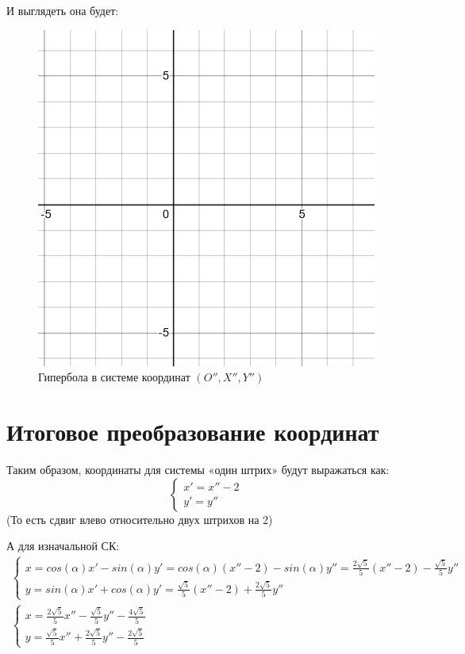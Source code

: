 \documentclass[12pt, a4paper]{article}
\begin{document}
    И выглядеть она будет:
    
    \begin{figure}[h!]
        \centering
        \includegraphics[width=\textwidth]{resources/1.7_grid_x'.png}
        \caption{Гипербола в системе координат $(O'', X'', Y'')$}
        \label{fig:grid_3}
    \end{figure}
    \FloatBarrier


    \section{Итоговое преобразование координат}

    Таким образом, координаты для системы «один штрих» будут выражаться как:
    \begin{equation}
        \begin{cases}
            x' = x'' - 2 \\
            y' = y''
        \end{cases}
    \end{equation}
    (То есть сдвиг влево относительно двух штрихов на 2)

    А для изначальной СК:
    \begin{gather}
        \begin{cases}
            x = cos(\alpha) x' - sin(\alpha) y' = cos(\alpha) (x'' - 2) - sin(\alpha) y'' = \frac{2 \sqrt{5}}{5} (x'' - 2) - \frac{\sqrt{5}}{5} y'' \\
            y = sin(\alpha) x' + cos(\alpha) y' = \frac{\sqrt{5}}{5} (x'' - 2) + \frac{2 \sqrt{5}}{5} y''
        \end{cases} \\
        \begin{cases}
            x = \frac{2 \sqrt{5}}{5} x'' - \frac{\sqrt{5}}{5} y'' - \frac{4 \sqrt{5}}{5} \\
            y = \frac{\sqrt{5}}{5} x'' + \frac{2 \sqrt{5}}{5} y'' - \frac{2 \sqrt{5}}{5}
        \end{cases}
    \end{gather}
\end{document}
